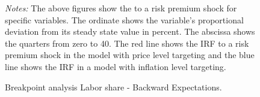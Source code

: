 \documentclass[11pt, a4paper, leqno]{article}
\begin{document}
\begin{figure}[ht!]
	\caption{Breakpoint analysis Labor share - Backward Expectations.}
	\centering
    	\bigskip
	\begin{minipage}{\textwidth}%
		\footnotesize\setlength{\baselineskip}{11pt}%
		\bigskip \textit{Notes:} The above figures show the  to a risk premium shock for specific variables. The ordinate shows the variable's proportional deviation from its steady state value in percent. The abscissa shows the quarters from zero to 40. The red line shows the IRF to a risk premium shock in the model with price level targeting and the blue line shows the IRF in a model with inflation level targeting.
	\end{minipage}
\end{figure}
\end{document}
